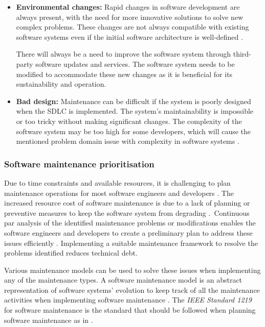 \begin{itemize}
	\item \textbf{Environmental changes:} Rapid changes in software development are always present, with the need for more innovative solutions to solve new complex problems. These changes are not always compatible with existing software systems even if the initial software architecture is well-defined \cite{Ogheneovo2014}. \par There will always be a need to improve the software system through third-party software updates and services. The software system needs to be modified to accommodate these new changes as it is beneficial for its sustainability and operation.
	\item \textbf{Bad design:} Maintenance can be difficult if the system is poorly designed when the SDLC is implemented. The system's maintainability is impossible or too tricky without making significant changes. The complexity of the software system may be too high for some developers, which will cause the mentioned problem domain issue with complexity in software systems \cite{Lenarduzzi2017}.
\end{itemize}

\clearpage

\subsubsection{Software maintenance prioritisation}\label{sec:ch1_maintenanceModel}
Due to time constraints and available resources, it is challenging to plan maintenance operations for most software engineers and developers \cite{DeLeon-Sigg2020}. The increased resource cost of software maintenance is due to a lack of planning or preventive measures to keep the software system from degrading \cite{Alenezi2016}.\ Continuous par analysis of the identified maintenance problems or modifications enables the software engineers and developers to create a preliminary plan to address these issues efficiently \cite{Port2017}. Implementing a suitable maintenance framework to resolve the problems identified reduces technical debt.\par Various maintenance models can be used to solve these issues when implementing any of the maintenance types. A software maintenance model is an abstract representation of software systems' evolution to keep track of all the maintenance activities when implementing software maintenance \cite{Ren2011}. The \textit{IEEE Standard 1219} for software maintenance is the standard that should be followed when planning software maintenance as in . 

